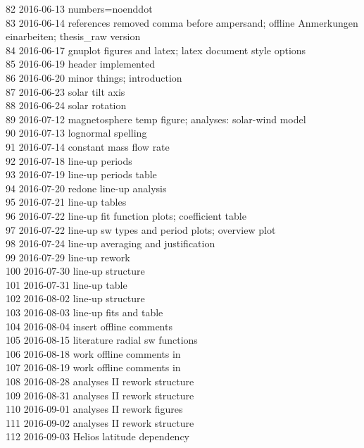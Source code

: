 \begin{footnotesize}
82	2016-06-13	numbers=noenddot\\
83	2016-06-14	references removed comma before ampersand; offline Anmerkungen einarbeiten; thesis\_raw version\\
84	2016-06-17	gnuplot figures and latex; latex document style options\\
85	2016-06-19	header implemented\\
86	2016-06-20	minor things; introduction\\
87	2016-06-23	solar tilt axis\\
88	2016-06-24	solar rotation\\
89	2016-07-12	magnetosphere temp figure; analyses: solar-wind model\\
90	2016-07-13	lognormal spelling\\
91	2016-07-14	constant mass flow rate\\
92	2016-07-18	line-up periods\\
93	2016-07-19	line-up periods table\\
94	2016-07-20	redone line-up analysis\\
95	2016-07-21	line-up tables\\
96	2016-07-22	line-up fit function plots; coefficient table\\
97	2016-07-22	line-up sw types and period plots; overview plot\\
98	2016-07-24	line-up averaging and justification\\
99	2016-07-29	line-up rework\\
100	2016-07-30	line-up structure\\
101	2016-07-31	line-up table\\
102	2016-08-02	line-up structure\\
103	2016-08-03	line-up fits and table\\
104	2016-08-04	insert offline comments\\
105	2016-08-15	literature radial sw functions\\
106	2016-08-18	work offline comments in\\
107	2016-08-19	work offline comments in\\
108	2016-08-28	analyses II rework structure\\
109	2016-08-31	analyses II rework structure\\
110	2016-09-01	analyses II rework figures\\
111	2016-09-02	analyses II rework structure\\
112	2016-09-03	Helios latitude dependency\\

\end{footnotesize}
